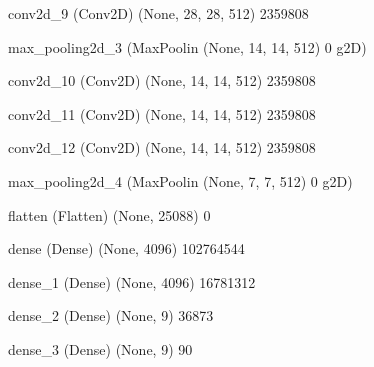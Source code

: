 \documentclass[11pt, a4paper]{article} %
\begin{document}
 conv2d_9 (Conv2D)           (None, 28, 28, 512)       2359808   
                                                                 
 max_pooling2d_3 (MaxPoolin  (None, 14, 14, 512)       0         
 g2D)                                                            
                                                                 
 conv2d_10 (Conv2D)          (None, 14, 14, 512)       2359808   
                                                                 
 conv2d_11 (Conv2D)          (None, 14, 14, 512)       2359808   
                                                                 
 conv2d_12 (Conv2D)          (None, 14, 14, 512)       2359808   
                                                                 
 max_pooling2d_4 (MaxPoolin  (None, 7, 7, 512)         0         
 g2D)                                                            
                                                                 
 flatten (Flatten)           (None, 25088)             0         
                                                                 
 dense (Dense)               (None, 4096)              102764544 
                                                                 
 dense_1 (Dense)             (None, 4096)              16781312  
                                                                 
 dense_2 (Dense)             (None, 9)                 36873     
                                                                 
 dense_3 (Dense)             (None, 9)                 90        
                                                                 
\end{document}
